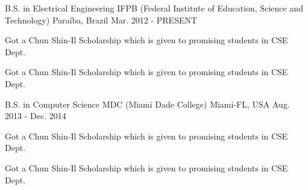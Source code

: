 

\begin{cventries}

  \cventry
    {B.S. in Electrical Engineering} %
    {IFPB (Federal Institute of Education, Science and Technology)} %
    {Paraíba, Brazil} %
    {Mar. 2012 - PRESENT} %
    {
      \begin{cvitems} %
        \item {Got a Chun Shin-Il Scholarship which is given to promising students in CSE Dept.}
        \item {Got a Chun Shin-Il Scholarship which is given to promising students in CSE Dept.}
      \end{cvitems}
    }
    
    \cventry
    {B.S. in Computer Science} %
    {MDC (Miami Dade College)} %
    {Miami-FL, USA} %
    {Aug. 2013 - Dec. 2014} %
    {
      \begin{cvitems} %
        \item {Got a Chun Shin-Il Scholarship which is given to promising students in CSE Dept.}
        \item {Got a Chun Shin-Il Scholarship which is given to promising students in CSE Dept.}
      \end{cvitems}
    }

\end{cventries}
